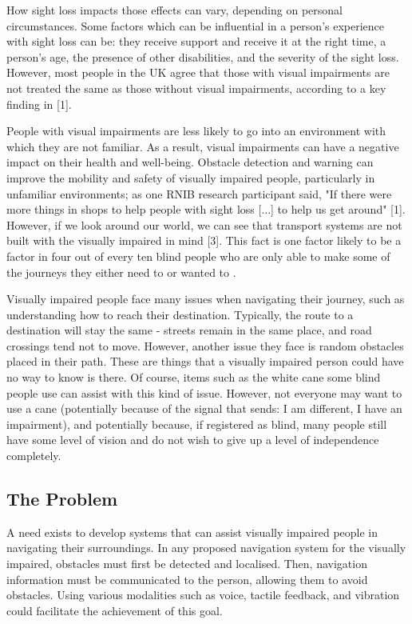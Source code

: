 \documentclass[conference]{IEEEtran}
\begin{document}
How sight loss impacts those effects can vary, depending on personal circumstances. Some factors which can be influential in a person's experience with sight loss can be: they receive support and receive it at the right time, a person's age, the presence of other disabilities, and the severity of the sight loss. However, most people in the UK agree that those with visual impairments are not treated the same as those without visual impairments, according to a key finding in [1].

People with visual impairments are less likely to go into an environment with which they are not familiar. As a result, visual impairments can have a negative impact on their health and well-being. Obstacle detection and warning can improve the mobility and safety of visually impaired people, particularly in unfamiliar environments; as one RNIB research participant said, "If there were more things in shops to help people with sight loss [...] to help us get around" [1]. However, if we look around our world, we can see that transport systems are not built with the visually impaired in mind [3]. This fact is one factor likely to be a factor in four out of every ten blind people who are only able to make some of the journeys they either need to or wanted to \cite{rnib}.

Visually impaired people face many issues when navigating their journey, such as understanding how to reach their destination. Typically, the route to a destination will stay the same - streets remain in the same place, and road crossings tend not to move. However, another issue they face is random obstacles placed in their path. These are things that a visually impaired person could have no way to know is there. Of course, items such as the white cane some blind people use can assist with this kind of issue. However, not everyone may want to use a cane (potentially because of the signal that sends: I am different, I have an impairment), and potentially because, if registered as blind, many people still have some level of vision and do not wish to give up a level of independence completely. 

\subsection{The Problem}
A need exists to develop systems that can assist visually impaired people in navigating their surroundings. In any proposed navigation system for the visually impaired, obstacles must first be detected and localised. Then, navigation information must be communicated to the person, allowing them to avoid obstacles. Using various modalities such as voice, tactile feedback, and vibration could facilitate the achievement of this goal.
 
\end{document}

